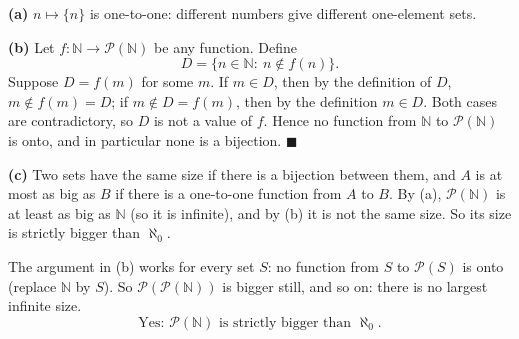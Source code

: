 \textbf{(a)} $n\mapsto\{n\}$ is one-to-one: different numbers give different one-element sets.

\textbf{(b)} Let $f:\mathbb N\to\mathcal P(\mathbb N)$ be any function. Define
\[D=\{n\in\mathbb N:\ n\notin f(n)\}.\]
Suppose $D=f(m)$ for some $m$. If $m\in D$, then by the definition of $D$, $m\notin f(m)=D$; if $m\notin D=f(m)$, then by the definition $m\in D$. Both cases are contradictory, so $D$ is not a value of $f$. Hence no function from $\mathbb N$ to $\mathcal P(\mathbb N)$ is onto, and in particular none is a bijection. $\blacksquare$

\textbf{(c)} Two sets have the same size if there is a bijection between them, and $A$ is at most as big as $B$ if there is a one-to-one function from $A$ to $B$. By (a), $\mathcal P(\mathbb N)$ is at least as big as $\mathbb N$ (so it is infinite), and by (b) it is not the same size. So its size is strictly bigger than $\aleph_0$.

The argument in (b) works for every set $S$: no function from $S$ to $\mathcal P(S)$ is onto (replace $\mathbb N$ by $S$). So $\mathcal P(\mathcal P(\mathbb N))$ is bigger still, and so on: there is no largest infinite size.
\[\boxed{\text{Yes: }\mathcal P(\mathbb N)\text{ is strictly bigger than }\aleph_0.}\]
